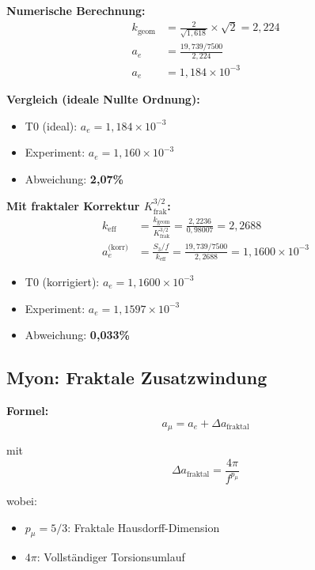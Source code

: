 	\textbf{Numerische Berechnung:}
	\begin{align}
		k_{\text{geom}} &= \frac{2}{\sqrt{1{,}618}} \times \sqrt{2} = 2{,}224 \\
		a_e &= \frac{19{,}739 / 7500}{2{,}224} \\
		a_e &= 1{,}184 \times 10^{-3}
	\end{align}
	
	\textbf{Vergleich (ideale Nullte Ordnung):}
	\begin{itemize}
		\item T0 (ideal): $a_e = 1{,}184 \times 10^{-3}$
		\item Experiment: $a_e = 1{,}160 \times 10^{-3}$
		\item Abweichung: \textbf{2{,}07\%}
	\end{itemize}
	
	\textbf{Mit fraktaler Korrektur $K_\text{frak}^{3/2}$:}
	\begin{align}
		k_\text{eff} &= \frac{k_\text{geom}}{K_\text{frak}^{3/2}} = \frac{2{,}2236}{0{,}98007} = 2{,}2688 \\
		a_e^\text{(korr)} &= \frac{S_3/f}{k_\text{eff}} = \frac{19{,}739/7500}{2{,}2688} = 1{,}1600 \times 10^{-3}
	\end{align}
	\begin{itemize}
		\item T0 (korrigiert): $a_e = 1{,}1600 \times 10^{-3}$
		\item Experiment: $a_e = 1{,}1597 \times 10^{-3}$
		\item Abweichung: \textbf{0{,}033\%}
	\end{itemize}

	
	\subsection{Myon: Fraktale Zusatzwindung}
	
	\textbf{Formel:}
	\begin{equation}
		a_\mu = a_e + \Delta a_{\text{fraktal}}
		\label{eq:amu}
	\end{equation}
	
	mit
	\begin{equation}
		\Delta a_{\text{fraktal}} = \frac{4\pi}{f^{p_\mu}}
		\label{eq:delta_mu}
	\end{equation}
	
	wobei:
	\begin{itemize}
		\item $p_\mu = 5/3$: Fraktale Hausdorff-Dimension
		\item $4\pi$: Vollständiger Torsionsumlauf
	\end{itemize}
	
